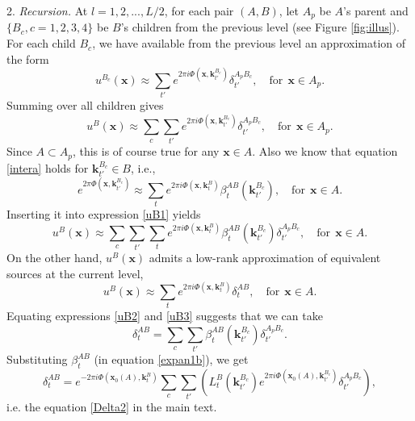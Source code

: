 2. {\it Recursion.} At $l=1,2,...,L/2$, for each pair $(A,B)$, let $A_p$ be $A$'s parent and $\{B_c, c=1,2,3,4\}$ be $B$'s children from the previous level (see Figure \ref{fig:illus}). For each child $B_c$, we have available from the previous level an approximation of the form 
\begin{equation}
u^{B_c}(\mathbf{x})\approx  
\sum_{t'} e^{2\pi i
  \Phi(\mathbf{x},\mathbf{k}_{t'}^{B_c})}\delta_{t'}^{A_pB_c}, \quad
 \text{for} \ \ \mathbf{x}\in A_p.
\end{equation}
Summing over all children gives
\begin{equation} \label{uB1}
u^{B}(\mathbf{x})\approx  
\sum_c \sum_{t'}  e^{2\pi i
  \Phi(\mathbf{x},\mathbf{k}_{t'}^{B_c})}\delta_{t'}^{A_pB_c}, \quad
 \text{for} \ \ \mathbf{x}\in A_p.
\end{equation} 
Since $A\subset A_p$, this is of course true for any $\mathbf{x}\in A$. Also we know that equation \ref{intera} holds for $\mathbf{k}_{t'}^{B_c}\in B$, i.e.,
\begin{equation}
e^{2\pi \Phi(\mathbf{x},\mathbf{k}_{t'}^{B_c})}\approx\sum_t e^{2\pi i
    \Phi(\mathbf{x},\mathbf{k}_t^B)}\beta_t^{AB}(\mathbf{k}_{t'}^{B_c}), \quad
  \text{for} \ \ \mathbf{x}\in A.
\end{equation}
Inserting it into expression \ref{uB1} yields
\begin{equation} \label{uB2}
u^{B}(\mathbf{x})\approx  
\sum_c \sum_{t'} \sum_t e^{2\pi i
    \Phi(\mathbf{x},\mathbf{k}_t^B)}\beta_t^{AB}(\mathbf{k}_{t'}^{B_c})\delta_{t'}^{A_pB_c}, \quad
 \text{for} \ \ \mathbf{x}\in A.
\end{equation} 
On the other hand, $u^B(\mathbf{x})$ admits a low-rank approximation of equivalent sources at the current level,
\begin{equation} \label{uB3}
u^{B}(\mathbf{x})\approx  
\sum_t  e^{2\pi i
  \Phi(\mathbf{x},\mathbf{k}_{t}^{B})}\delta_{t}^{AB}, \quad
 \text{for} \ \ \mathbf{x}\in A.
\end{equation}
Equating expressions \ref{uB2} and \ref{uB3} suggests that we can take
\begin{equation} \label{mdelta1}
\delta_t^{AB}=\sum_c\sum_{t'}\beta_t^{AB}(\mathbf{k}_{t'}^{B_c})\delta_{t'}^{A_pB_c}.
\end{equation}
Substituting $\beta_t^{AB}$ (in equation \ref{expan1b}), we get
\begin{equation} \label{delta2}
\delta_t^{AB}=e^{-2\pi i
  \Phi(\mathbf{x}_0(A),\mathbf{k}_t^B)}\sum_c\sum_{t'}
\left(L_t^B(\mathbf{k}_{t'}^{B_c})e^{2\pi i
  \Phi(\mathbf{x}_0(A),\mathbf{k}_{t'}^{B_c})}\delta_{t'}^{A_pB_c}\right),
\end{equation}
i.e. the equation \ref{Delta2} in the main text.

